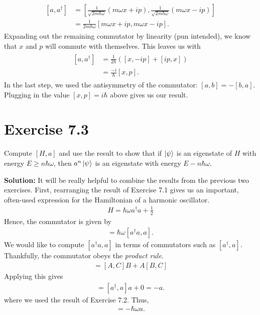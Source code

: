 \documentclass{book}
\begin{document}
    \begin{align}
    \begin{aligned}
        [a, a^\dagger] &= \left[\frac{1}{\sqrt{2m\hbar \omega}}\left(m\omega x + ip\right), \frac{1}{\sqrt{2m\hbar \omega}}\left(m\omega x - ip\right)\right] \\
        &= \frac{1}{2m\hbar \omega}\left[m\omega x + ip, m\omega x - ip\right].
    \end{aligned}
    \end{align}
    Expanding out the remaining commutator by linearity (pun intended), we know that $x$ and $p$ will commute with themselves. This leaves us with 
    \begin{align}
    \begin{aligned}
        [a, a^\dagger] &= \frac{1}{2\hbar} \left([x, -ip] + [ip,x]\right) \\
        &= \frac{-i}{\hbar}[x,p] .
    \end{aligned}
    \end{align}
    In the last step, we used the antisymmetry of the commutator: $[a,b] = -[b,a]$. Plugging in the value $[x,p] = i \hbar$ above gives us our result.

\section*{Exercise 7.3}
    Compute $[H, a]$ and use the result to show that if $\ket{\psi}$ is an eigenstate of $H$ with energy $E \geq n\hbar \omega$, then $a^n \ket{\psi}$ is an eigenstate with energy $E - n\hbar \omega$.

    \textbf{Solution:} It will be really helpful to combine the results from the previous two exercises. First, rearranging the result of Exercise 7.1 gives us an important, often-used expression for the Hamiltonian of a harmonic oscillator.
    \begin{align}
        H = \hbar \omega a^\dagger a + \frac{1}{2}
    \end{align}
    Hence, the commutator is given by
    \begin{align}
        [H, a] = \hbar \omega [a^\dagger a , a].
    \end{align}
    We would like to compute $[a^\dagger a, a]$ in terms of commutators such as $[a^\dagger, a]$. Thankfully, the commutator obeys the \emph{product rule}. 
    \begin{align}
        [AB, C] = [A, C]B + A[B,C]
    \end{align}
    Applying this gives
    \begin{align}
        [a^\dagger a, a] = [a^\dagger, a] a + 0 = -a.
    \end{align}
    where we used the result of Exercise 7.2. Thus,
    \begin{align}
        [H,a] = -\hbar\omega a.
    \end{align}
\end{document}
